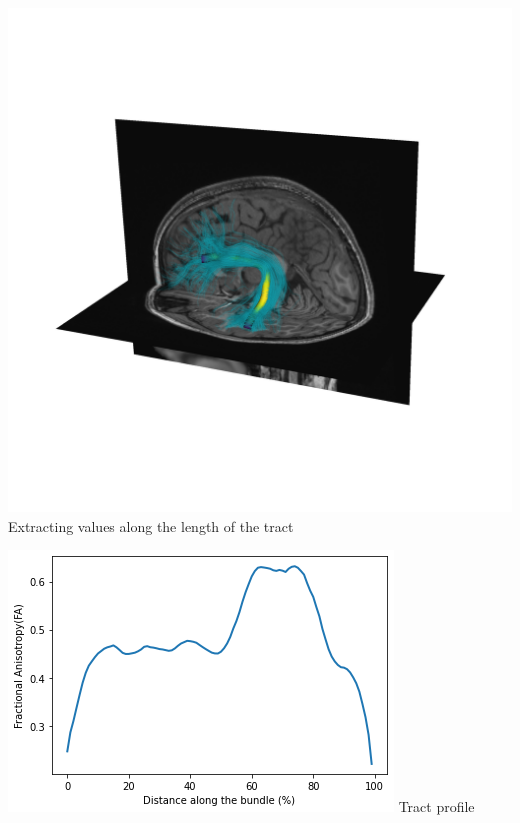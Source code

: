 \documentclass[a0paper,landscape,fontscale=0.365]{baposter}
\newenvironment{Figure}
  {\par\medskip\noindent\minipage{\linewidth}}
  {\endminipage\par\medskip}
\begin{document}
\begin{poster}
{\begin{itemize}[nosep, leftmargin=*]
\begin{multicols}{4}
        \columnbreak
        \begin{Figure}
            \centering
            \includegraphics[width=1.0\linewidth]{figures/arc_profile_trk}
            Extracting values along the length of the tract
        \end{Figure}
        \columnbreak
        \begin{Figure}
            \vspace{1.0cm}
            \centering
            \includegraphics[width=1.0\linewidth]{figures/tract_profile}
            Tract profile
        \end{Figure}


\end{multicols}
\end{itemize}}
\end{poster}
\end{document}
